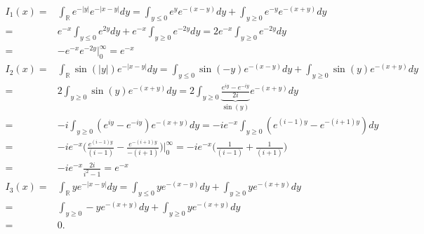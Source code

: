 \documentclass{article}
\begin{document}
\begin{enumerate}
\begin{enumerate}
\begin{enumerate}
\begin{enumerate}
					\end{enumerate}
					$$
					\begin{aligned}
						I_{1}(x) 
						= & \int_{\mathbb{R}}e^{-|y|}e^{-|x-y|} dy = \int_{y \leq 0 }e^{y}e^{-(x-y)} dy + \int_{y \geq 0 }e^{-y}e^{-(x+y)} dy \\
						= & e^{-x}\int_{y \leq 0 }e^{2y} dy + e^{-x}\int_{y \geq 0 }e^{-2y} dy = 2e^{-x}\int_{y \geq 0 }e^{-2y} dy \\
						= & -e^{-x}e^{-2y}\Big|^{\infty}_{0} = e^{-x} \\
						I_{2}(x) 
						= & \int_{\mathbb{R}}\sin(|y|)e^{-|x-y|} dy = \int_{y \leq 0 }\sin(-y)e^{-(x-y)} dy + \int_{y \geq 0 }\sin(y)e^{-(x+y)} dy \\
						= & 2 \int_{y \geq 0 }\sin(y)e^{-(x+y)} dy = 2 \int_{y \geq 0 } \underbrace{\frac{e^{iy} - e^{-iy}}{2i}}_{\sin(y)} e^{-(x+y)} dy \\
						= & -i\int_{y \geq 0 }(e^{iy} - e^{-iy})e^{-(x+y)} dy = -ie^{-x}\int_{y \geq 0 }(e^{(i-1)y} - e^{-(i+1)y})dy \\
						=  & -ie^{-x}\Big( \frac{e^{(i-1)y}}{(i-1)} - \frac{e^{-(i+1)y}}{-(i+1)} \Big) \Big|^{\infty}_{0} = -ie^{-x}\Big( \frac{1}{(i-1)} + \frac{1}{(i+1)} \Big) \\
						= & -ie^{-x} \frac{2i}{i^{2} - 1} = e^{-x} \\
						I_{3}(x)
						= & \int_{\mathbb{R}} y e^{-|x-y|} dy = \int_{y \leq 0 }ye^{-(x-y)} dy + \int_{y \geq 0 }ye^{-(x+y)} dy \\
						= & \int_{y \geq 0 }-ye^{-(x+y)} dy + \int_{y \geq 0 }ye^{-(x+y)} dy \\
						= & 0.
					\end{aligned}
					$$
				\end{enumerate}
			\end{enumerate}
	\end{enumerate}
		
\end{document}
